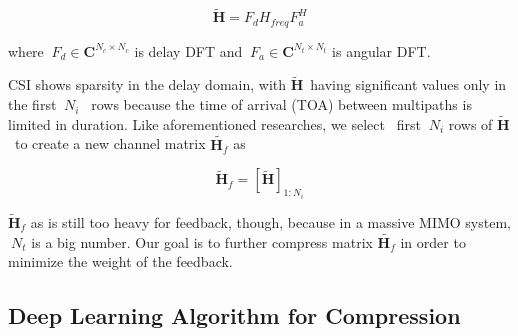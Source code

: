 \documentclass[lettersize,journal]{IEEEtran}
\begin{document}
\begin{equation}
 \tilde{\textbf{H}}=F_{d}H_{freq}F^{H}_{a}
\end{equation}

where  \begin{math} \ F_{d}\in \textbf{C}^{N_{c}\times N_{c}}\end{math} is delay DFT and \begin{math} \ F_{a}\in \textbf{C}^{N_{t}\times N_{t}}\end{math} is angular DFT.

CSI shows sparsity in the delay domain, with \begin{math} \tilde{\textbf{H}} \end{math} having significant values only in the first \begin{math} \ N_{i} \end{math}  rows because the time of arrival (TOA) between multipaths is limited in duration. Like aforementioned researches, we select  first 
\begin{math} \ N_{i} \end{math} rows of \begin{math} \tilde{\textbf{H}} \end{math} to create a new channel matrix \begin{math} \tilde{\textbf{H}_{f}} \end{math} as

\begin{equation}
 	 \tilde{\textbf{H}}_{f}=\left[ \tilde{\textbf{H}} \right]_{1:N_{i}} 
\end{equation}

\begin{math} \tilde{\textbf{H}}_{f} \end{math} as is still too heavy for feedback, though, because in a massive MIMO system, \begin{math}\ N_{t}\end{math} is a big number. Our goal is to further compress matrix \begin{math} \tilde{\textbf{H}_{f}} \end{math} in order to minimize the weight of the feedback. 

\subsection{Deep Learning Algorithm for Compression}\label{AA}
\end{document}
